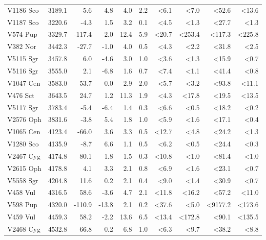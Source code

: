 \documentclass{aa}
\begin{document}
\begin{longtable}{lrrrrrrrrr}
	V1186 Sco &  3189.1 &   -5.6 &   4.8 &   4.0 &       2.2 &   <6.1 &    <7.0 &    <52.6 &   <13.6 \\
	V1187 Sco &  3220.6 &   -4.3 &   1.5 &   3.2 &       0.1 &   <4.5 &    <1.3 &    <27.7 &    <1.3 \\
	V574 Pup &  3329.7 & -117.4 &  -2.0 &  12.4 &       5.9 &  <20.7 &  <253.4 &   <117.3 &  <225.8 \\
	V382 Nor &  3442.3 &  -27.7 &  -1.0 &   4.0 &       0.5 &   <4.3 &    <2.2 &    <31.8 &    <2.5 \\
	V5115 Sgr &  3457.8 &    6.0 &  -4.6 &   3.0 &       1.0 &   <3.6 &    <1.3 &    <15.9 &    <0.7 \\
	V5116 Sgr &  3555.0 &    2.1 &  -6.8 &   1.6 &       0.7 &   <7.4 &    <1.1 &    <41.4 &    <0.8 \\
	V1047 Cen &  3583.0 &  -53.7 &   0.0 &   2.9 &       2.0 &   <5.7 &    <3.2 &    <93.8 &   <11.1 \\
	V476 Sct &  3643.5 &   24.7 &   1.2 &  11.3 &       1.9 &   <4.3 &   <17.8 &    <19.5 &   <13.5 \\
	V5117 Sgr &  3783.4 &   -5.4 &  -6.4 &   1.4 &       0.3 &   <6.6 &    <0.5 &    <18.2 &    <0.2 \\
	V2576 Oph &  3831.6 &   -3.8 &   5.4 &   1.8 &       1.0 &   <5.9 &    <1.6 &    <17.1 &    <0.4 \\
	V1065 Cen &  4123.4 &  -66.0 &   3.6 &   3.3 &       0.5 &  <12.7 &    <4.8 &    <24.2 &    <1.3 \\
	V1280 Sco &  4135.9 &   -8.7 &   6.6 &   1.1 &       0.5 &   <6.2 &    <0.5 &    <24.4 &    <0.3 \\
	V2467 Cyg &  4174.8 &   80.1 &   1.8 &   1.5 &       0.3 &  <10.8 &    <1.0 &    <81.4 &    <1.0 \\
	V2615 Oph &  4178.8 &    4.1 &   3.3 &   2.1 &       0.8 &   <6.9 &    <1.6 &    <23.1 &    <0.7 \\
	V5558 Sgr &  4204.8 &   11.6 &   0.2 &   2.1 &       0.4 &   <9.0 &    <1.4 &    <30.9 &    <0.7 \\
	V458 Vul &  4316.5 &   58.6 &  -3.6 &   4.7 &       2.1 &  <11.8 &   <16.2 &    <57.2 &   <11.0 \\
	V598 Pup &  4320.0 & -110.9 & -13.8 &   2.1 &       0.2 &  <37.6 &    <5.0 &  <9177.2 &  <173.6 \\
	V459 Vul &  4459.3 &   58.2 &  -2.2 &  13.6 &       6.5 &  <13.4 &  <172.8 &    <90.1 &  <135.5 \\
	V2468 Cyg &  4532.8 &   66.8 &   0.2 &   6.8 &       1.0 &   <6.3 &    <9.7 &    <38.2 &    <8.8 \\

\end{longtable}
\end{document}
